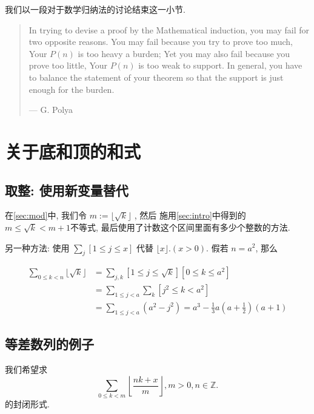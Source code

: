 \documentclass{ctexart}
\begin{document}
我们以一段对于数学归纳法的讨论结束这一小节. 

\begin{quote}
    In trying to devise a proof by the Mathematical induction, you may fail for two opposite reasons. You may fail because you try to prove too much, Your $P(n)$ is too heavy a burden; Yet you may also fail because you prove too little, Your $P(n)$ is too weak to support. In general, you have to balance the statement of your theorem so that the support is just enough for the burden. 
    
    \hfill --- G. Polya
\end{quote}

\newpage
\section{关于底和顶的和式}

\subsection{取整: 使用新变量替代} 
在\cref{sec:mod}中, 我们令 $m:=\lfloor\sqrt{k}\rfloor$ , 然后 施用\cref{sec:intro}中得到的$m \leqslant \sqrt{k}<m+1$不等式, 最后使用了计数这个区间里面有多少个整数的方法. 

另一种方法: 使用 $\sum_j[1 \leqslant j \leqslant x]$ 代替 $\lfloor x\rfloor .(x>0)$. 假若 $n=a^2$, 那么

$$\begin{aligned} \sum_{0 \leqslant k<n}\lfloor\sqrt{k}\rfloor & =\sum_{j, k}[1 \leqslant j \leqslant \sqrt{k}]\left[0 \leqslant k \leqslant a^2\right] \\ & =\sum_{1 \leqslant j<a} \sum_k\left[j^2 \leqslant k<a^2\right] \\ & =\sum_{1 \leqslant j<a}\left(a^2-j^2\right)=a^3-\frac{1}{3} a\left(a+\frac{1}{2}\right)(a+1)\end{aligned}$$

\subsection{等差数列的例子} 我们希望求
$$
\sum_{0 \leq k<m}\left\lfloor\frac{n k+x}{m}\right\rfloor, m>0, n \in \mathbb{Z} .
$$
的封闭形式. 
\end{document}
